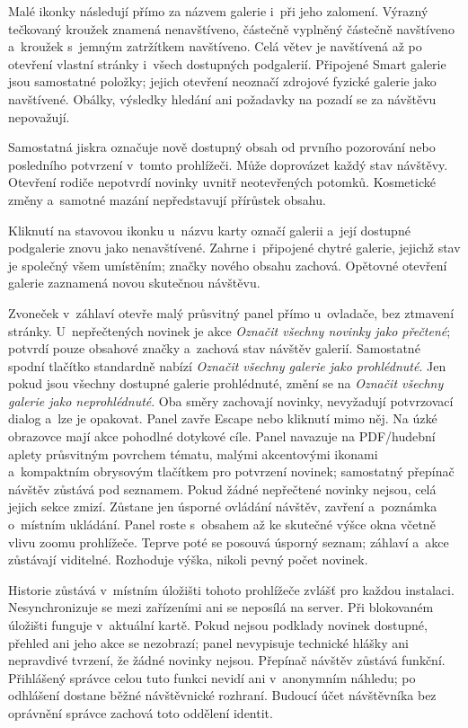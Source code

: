 \documentclass[11pt,a4paper]{article}
\begin{document}
Malé ikonky následují přímo za názvem galerie i~při jeho zalomení. Výrazný
tečkovaný
kroužek znamená nenavštíveno, částečně vyplněný částečně navštíveno a~kroužek
s~jemným zatržítkem navštíveno. Celá větev je navštívená až po otevření vlastní
stránky i~všech dostupných podgalerií. Připojené Smart galerie jsou samostatné
položky; jejich otevření neoznačí zdrojové fyzické galerie jako navštívené.
Obálky, výsledky hledání ani požadavky na pozadí se za návštěvu nepovažují.

Samostatná jiskra označuje nově dostupný obsah od prvního pozorování nebo
posledního potvrzení v~tomto prohlížeči. Může doprovázet každý stav návštěvy.
Otevření rodiče nepotvrdí novinky uvnitř neotevřených potomků. Kosmetické změny
a~samotné mazání nepředstavují přírůstek obsahu.

Kliknutí na stavovou ikonku u~názvu karty označí galerii a~její dostupné
podgalerie znovu jako nenavštívené. Zahrne i~připojené chytré galerie, jejichž
stav je společný všem umístěním; značky nového obsahu zachová. Opětovné otevření
galerie zaznamená novou skutečnou návštěvu.

Zvoneček v~záhlaví otevře malý průsvitný panel přímo u~ovladače, bez ztmavení
stránky. U~nepřečtených novinek je akce
\emph{Označit všechny novinky jako přečtené}; potvrdí pouze obsahové značky
a~zachová stav návštěv galerií. Samostatné spodní tlačítko standardně nabízí
\emph{Označit všechny galerie jako prohlédnuté}. Jen pokud jsou všechny dostupné
galerie prohlédnuté, změní se na
\emph{Označit všechny galerie jako neprohlédnuté}. Oba směry zachovají novinky,
nevyžadují potvrzovací dialog a~lze je opakovat. Panel zavře Escape nebo
kliknutí
mimo něj. Na úzké obrazovce mají
akce pohodlné dotykové cíle. Panel navazuje na PDF/hudební aplety průsvitným
povrchem tématu, malými akcentovými ikonami a~kompaktním obrysovým tlačítkem
pro potvrzení novinek; samostatný přepínač návštěv zůstává pod seznamem.
Pokud žádné nepřečtené novinky nejsou, celá jejich sekce zmizí. Zůstane jen
úsporné ovládání návštěv, zavření a~poznámka o~místním ukládání.
Panel roste s~obsahem až ke skutečné výšce okna včetně vlivu zoomu prohlížeče.
Teprve poté se posouvá úsporný seznam; záhlaví a~akce zůstávají viditelné.
Rozhoduje výška, nikoli pevný počet novinek.

Historie zůstává v~místním úložišti tohoto prohlížeče zvlášť pro každou
instalaci. Nesynchronizuje se mezi zařízeními ani se neposílá na server.
Při blokovaném úložišti funguje v~aktuální kartě. Pokud nejsou podklady novinek
dostupné, přehled ani jeho akce se nezobrazí; panel nevypisuje technické hlášky
ani nepravdivé tvrzení, že žádné novinky nejsou. Přepínač návštěv zůstává
funkční.
Přihlášený správce celou tuto funkci
nevidí ani v~anonymním náhledu; po odhlášení dostane běžné návštěvnické
rozhraní. Budoucí účet návštěvníka bez oprávnění správce zachová toto oddělení
identit.
\end{document}
